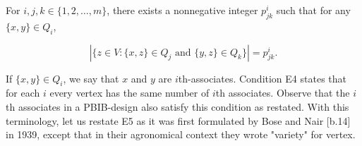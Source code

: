 For $i, j, k \in \{1, 2, \ldots, m\}$, there exists a nonnegative integer $p_{jk}^i$ such that for any $\{x, y\} \in Q_i$,

$$\left| \{z \in V: \{x, z\} \in Q_j \text{ and } \{y, z\} \in Q_k\} \right| = p_{jk}^i.$$

If $\{x, y\} \in Q_i$, we say that $x$ and $y$ are $i$th-associates. Condition E4 states that for each $i$ every vertex has the same number of $i$th associates. Observe that the $i$th associates in a PBIB-design also satisfy this condition as restated. With this terminology, let us restate E5 as it was first formulated by Bose and Nair [b.14] in 1939, except that in their agronomical context they wrote "variety" for vertex.
